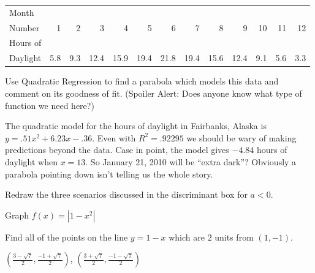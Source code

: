 \documentclass{ximera}
\begin{document}
\begin{problem}
\begin{enumerate}
\medskip

\small

\noindent \begin{tabular}{|l|r|r|r|r|r|r|r|r|r|r|r|r|} \hline
Month  & & & & & & & & & & & & \\
Number & 1 & 2 & 3 & 4 & 5 & 6 & 7 & 8 & 9 & 10 & 11 & 12\\ 
\hline 
Hours of  & & & & & & & & & & & & \\
Daylight & 5.8 & 9.3 & 12.4 & 15.9 & 19.4 & 21.8 & 19.4 & 15.6 & 12.4 & 9.1 & 5.6 & 3.3 \\ \hline
\end{tabular}

\normalsize

\medskip

\noindent Use Quadratic Regression to find a parabola which models this data and comment on its goodness of fit. (Spoiler Alert: Does anyone know what type of function we need here?)

\begin{solution}
    
\item The quadratic model for the hours of daylight in Fairbanks, Alaska is $y = .51x^{2} + 6.23x - .36$.  Even with $R^{2} = .92295$ we should be wary of making predictions beyond the data.  Case in point, the model gives $-4.84$ hours of daylight when $x = 13$.  So January 21, 2010 will be ``extra dark''?  Obviously a parabola pointing down isn't telling us the whole story.
\end{solution}

\end{enumerate}
\end{problem}

\begin{problem}\label{redrawthezeroscenarios}
Redraw the three scenarios discussed in the discriminant box for $a<0$.    
\end{problem}
  
\begin{problem}
Graph $f(x) = |1 - x^{2}|$
\end{problem}

\begin{problem}
Find all of the points on the line $y=1-x$ which are $2$ units from $(1,-1)$.
\begin{solution}
    $\left(\frac{3 - \sqrt{7}}{2}, \frac{-1 + \sqrt{7}}{2} \right)$, $\left(\frac{3 + \sqrt{7}}{2}, \frac{-1 - \sqrt{7}}{2} \right)$
\end{solution}

\end{problem}
\end{document}
